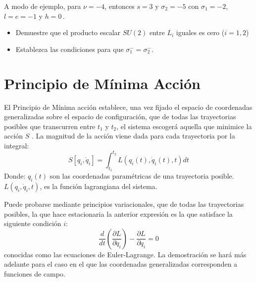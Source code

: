 \begin{frame}
A modo de ejemplo,
para $\nu=-4$, entonces $s=3$ y $\sigma_2=-5$ con $\sigma_1=-2$, $l=e=-1$ y $h=0$\,.



  \begin{itemize}
  \item Demuestre que el producto escalar $SU(2)$ entre $L_i$ iguales es cero ($i=1,2$) 
  \item   Establezca las condiciones para que $\sigma_1^-=\sigma_2^-$.
  \end{itemize}

\end{frame}



\section{Principio de Mínima Acción}
\label{sec:la}



El Principio de Mínima acción establece, una vez fijado el espacio de
coordenadas generalizadas sobre el espacio de configuración, que de
todas las trayectorias posibles que transcurren entre $t_1$ y $t_2$,
el sistema escogerá aquella que minimice la acción $S$
\cite{ActionPhysics}.  La magnitud de la acción viene dada para cada
trayectoria por la integral:
\begin{equation}
  \label{eq:la}
   S\left[q_i,\dot{q}_i\right] = \int_{t_{1}}^{t_{2}} L(q_i(t), \dot{q}_i(t),t) dt
\end{equation}
Donde:
$q_i(t)$ son las coordenadas paramétricas de una trayectoria posible.
$L(q_i,\dot{q}_i,t)$, es la función lagrangiana del sistema.


Puede probarse mediante principios variacionales, que de todas las trayectorias posibles, la que hace  estacionaria la anterior expresión es la que satisface la siguiente condición $i$:
\begin{equation}
  \label{eq:eel}
 \frac{d}{dt} \left ( \frac{\partial L}{\partial\dot{q}_i} \right ) - \frac{\partial L}{\partial q_i} = 0
\end{equation}
conocidas como las ecuaciones de Euler-Lagrange. La demostración se
hará más adelante para el caso en el que las coordenadas generalizadas
corresponden a funciones de campo. 

